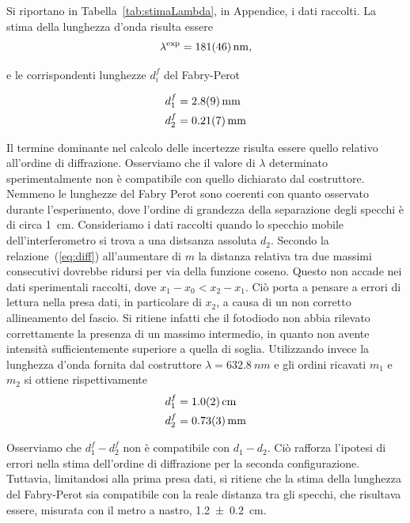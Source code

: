 \documentclass[10pt,oneside,a4paper]{article}
\begin{document}
\begin{multicols}{2}
Si riportano in Tabella~\ref{tab:stimaLambda}, in Appendice, i dati raccolti. La stima della lunghezza d'onda risulta essere
\[
\lambda^{\text{exp}} = \SI{ 181 \pm 46}{nm},
\]

e le corrispondenti lunghezze $d_i^f$ del Fabry-Perot

\[
\begin{aligned}
d_1^f &= \SI{2.8 \pm 0.9}{mm} \\
d_2^f &= \SI{0.21 \pm 0.07}{mm}
\end{aligned}
\]

Il termine dominante nel calcolo delle incertezze risulta essere quello relativo all'ordine di diffrazione. Osserviamo che il valore di $\lambda$ determinato sperimentalmente non è compatibile con quello dichiarato dal costruttore. Nemmeno le lunghezze del Fabry Perot sono coerenti con quanto osservato durante l'esperimento, dove l'ordine di grandezza della separazione degli specchi è di circa \SI{1}{cm}. Consideriamo i dati raccolti quando lo specchio mobile dell'interferometro si trova a una distsanza assoluta $d_2$. Secondo la relazione~(\ref{eq:diff}) all'aumentare di $m$ la distanza relativa tra due massimi consecutivi dovrebbe ridursi per via della funzione coseno. Questo non accade nei dati sperimentali raccolti, dove $x_1-x_0 < x_2-x_1$. Ciò porta a pensare a errori di lettura nella presa dati, in particolare di $x_2$, a causa di un non corretto allineamento del fascio. Si ritiene infatti che il fotodiodo non abbia rilevato correttamente la presenza di un massimo intermedio, in quanto non avente intensità sufficientemente superiore a quella di soglia.
Utilizzando invece la lunghezza d'onda fornita dal costruttore $\lambda = \SI{632.8}{nm}$ e gli ordini ricavati $m_1$ e $m_2$ si ottiene rispettivamente
\[
\begin{aligned}
d_1^f &= \SI{1 \pm 0.2}{cm} \\
d_2^f &= \SI{0.73 \pm 0.03}{mm}
\end{aligned}
\]

Osserviamo che $d_1^f-d_2^f$ non è compatibile con $d_1 - d_2$. Ciò rafforza l'ipotesi di errori nella stima dell'ordine di diffrazione per la seconda configurazione. Tuttavia, limitandosi alla prima presa dati, si ritiene che la stima della lunghezza del Fabry-Perot sia compatibile con la reale distanza tra gli specchi, che risultava essere, misurata con il metro a nastro, \SI{1.2 \pm 0.2}{cm}.




\end{multicols}
\end{document}
